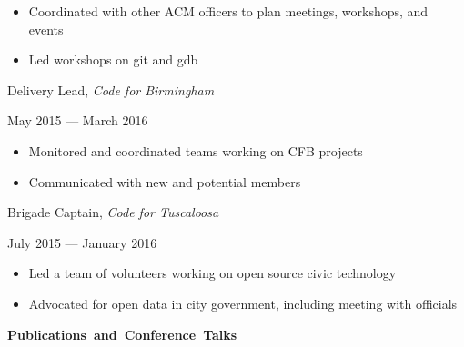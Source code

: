 \documentclass[11pt]{article}
\begin{document}
\begin{itemize}
  \item Coordinated with other ACM officers to plan meetings, workshops, and events
  \item Led workshops on git and gdb
\end{itemize}

\vspace{0.4em}
\begin{minipage}[t]{0.65\textwidth}
\flushleft
Delivery Lead, \textit{Code for Birmingham}\\
\end{minipage}
\begin{minipage}[t]{0.30\textwidth}
\flushright
May 2015 --- March 2016\\
\end{minipage}

\begin{itemize}
  \item Monitored and coordinated teams working on CFB projects
  \item Communicated with new and potential members
\end{itemize}

\begin{minipage}[t]{0.65\textwidth}
\flushleft
Brigade Captain, \textit{Code for Tuscaloosa}\\
\end{minipage}
\begin{minipage}[t]{0.30\textwidth}
\flushright
July 2015 --- January 2016\\
\end{minipage}

\begin{itemize}
  \item Led a team of volunteers working on open source civic technology
  \item Advocated for open data in city government, including meeting with officials
\end{itemize}

\vspace{0.8em}
\hbox{\large \textbf{Publications and Conference Talks}}
\end{document}
